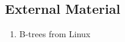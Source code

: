 \begin{appendices}
%
%
\chapter{External Material}


    \begin{enumerate}
        \item B-trees from Linux
    \end{enumerate}

\end{appendices}
